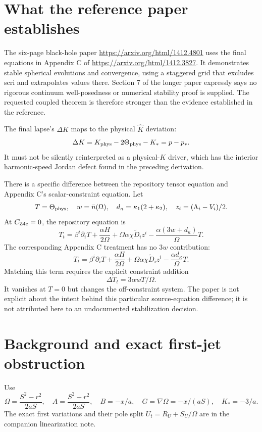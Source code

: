 \documentclass[11pt]{article}
\newcommand{\dd}{\partial}
\begin{document}
\section{What the reference paper establishes}
The six-page black-hole paper \url{https://arxiv.org/html/1412.4801} uses the final equations in Appendix C of \url{https://arxiv.org/html/1412.3827}. It demonstrates stable spherical evolutions and convergence, using a staggered grid that excludes scri and extrapolates values there. Section 7 of the longer paper expressly says no rigorous continuum well-posedness or numerical stability proof is supplied. The requested coupled theorem is therefore stronger than the evidence established in the reference.

The final lapse's $\Delta K$ maps to the physical $\hat K$ deviation:
\[
\Delta K=K_{\rm phys}-2\Theta_{\rm phys}-K_*=p-p_*.
\]
It must not be silently reinterpreted as a physical-$K$ driver, which has the interior harmonic-speed Jordan defect found in the preceding derivation.

There is a specific difference between the repository tensor equation and Appendix C's scalar-constraint equation. Let
\[
T=\Theta_{\rm phys},\quad w=\bar n(\Omega),\quad
d_\kappa=\kappa_1(2+\kappa_2),\quad z_i=(\Lambda_i-V_i)/2.
\]
At $C_{\rm Z4c}=0$, the repository equation is
\[
T_t=\beta^i\dd_iT+\frac{\alpha H}{2\Omega}
+\Omega\alpha\chi\widetilde D_i z^i
-\frac{\alpha(3w+d_\kappa)}{\Omega}T .
\]
The corresponding Appendix C treatment has no $3w$ contribution:
\[
T_t=\beta^i\dd_iT+\frac{\alpha H}{2\Omega}
+\Omega\alpha\chi\widetilde D_i z^i
-\frac{\alpha d_\kappa}{\Omega}T .
\]
Matching this term requires the explicit constraint addition
\[
\boxed{\Delta T_t=3\alpha wT/\Omega.}
\]
It vanishes at $T=0$ but changes the off-constraint system. The paper is not explicit about the intent behind this particular source-equation difference; it is not attributed here to an undocumented stabilization decision.

\section{Background and exact first-jet obstruction}
Use
\[
\Omega=\frac{S^2-r^2}{2aS},\quad
A=\frac{S^2+r^2}{2aS},\quad B=-x/a,\quad
G=\nabla\Omega=-x/(aS),\quad K_*=-3/a.
\]
The exact first variations and their pole split $U_t=R_U+S_U/\Omega$ are in the companion linearization note.
\end{document}
